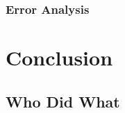 \documentclass{article}
\begin{document}
\subsubsection{Error Analysis}

\section{Conclusion}\label{conclusion}

\subsection{Who Did What}
\end{document}
